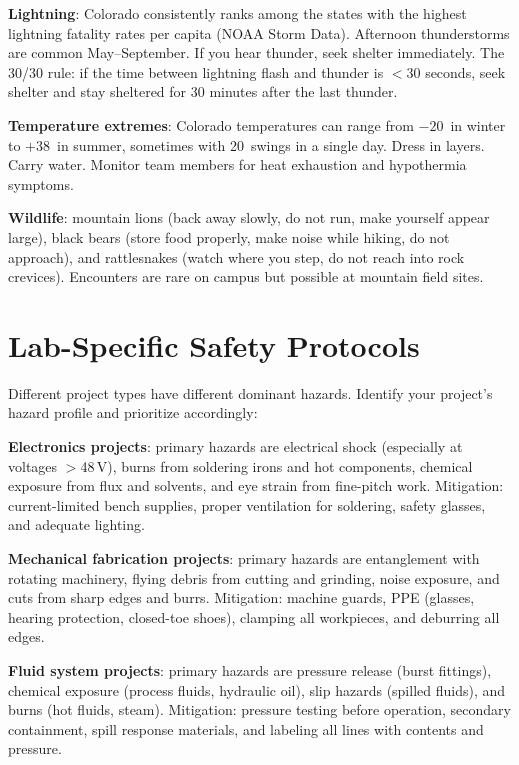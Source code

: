 \textbf{Lightning}: Colorado consistently ranks among the states with the highest lightning fatality rates per capita (NOAA Storm Data). Afternoon thunderstorms are common May--September. If you hear thunder, seek shelter immediately. The 30/30 rule: if the time between lightning flash and thunder is $<$30 seconds, seek shelter and stay sheltered for 30 minutes after the last thunder.

\textbf{Temperature extremes}: Colorado temperatures can range from $-20$\,\degC{} in winter to $+38$\,\degC{} in summer, sometimes with 20\,\degC{} swings in a single day. Dress in layers. Carry water. Monitor team members for heat exhaustion and hypothermia symptoms.

\textbf{Wildlife}: mountain lions (back away slowly, do not run, make yourself appear large), black bears (store food properly, make noise while hiking, do not approach), and rattlesnakes (watch where you step, do not reach into rock crevices). Encounters are rare on campus but possible at mountain field sites.



\section{Lab-Specific Safety Protocols}
Different project types have different dominant hazards. Identify your project's hazard profile and prioritize accordingly:

\textbf{Electronics projects}: primary hazards are electrical shock (especially at voltages $>$48\,V), burns from soldering irons and hot components, chemical exposure from flux and solvents, and eye strain from fine-pitch work. Mitigation: current-limited bench supplies, proper ventilation for soldering, safety glasses, and adequate lighting.

\textbf{Mechanical fabrication projects}: primary hazards are entanglement with rotating machinery, flying debris from cutting and grinding, noise exposure, and cuts from sharp edges and burrs. Mitigation: machine guards, PPE (glasses, hearing protection, closed-toe shoes), clamping all workpieces, and deburring all edges.

\textbf{Fluid system projects}: primary hazards are pressure release (burst fittings), chemical exposure (process fluids, hydraulic oil), slip hazards (spilled fluids), and burns (hot fluids, steam). Mitigation: pressure testing before operation, secondary containment, spill response materials, and labeling all lines with contents and pressure.

